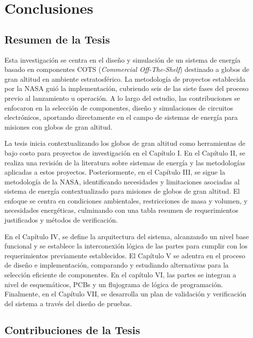 \chapter{Conclusiones}

\section{Resumen de la Tesis}


Esta investigación se centra en el diseño y simulación de un sistema de energía basado en componentes COTS (\emph{Commercial Off-The-Shelf}) destinado a globos de gran altitud en ambiente estratosférico. La metodología de proyectos establecida por la NASA guió la implementación, cubriendo seis de las siete fases del proceso previo al lanzamiento u operación. A lo largo del estudio, las contribuciones se enfocaron en la selección de componentes, diseño y simulaciones de circuitos electrónicos, aportando directamente en el campo de sistemas de energía para misiones con globos de gran altitud.

La tesis inicia contextualizando los globos de gran altitud como herramientas de bajo costo para proyectos de investigación en el Capítulo I. En el Capítulo II, se realiza una revisión de la literatura sobre sistemas de energía y las metodologías aplicadas a estos proyectos. Posteriormente, en el Capítulo III, se sigue la metodología de la NASA, identificando necesidades y limitaciones asociadas al sistema de energía contextualizado para misiones de globos de gran altitud. El enfoque se centra en condiciones ambientales, restricciones de masa y volumen, y necesidades energéticas, culminando con una tabla resumen de requerimientos justificados y métodos de verificación.

En el Capítulo IV, se define la arquitectura del sistema, alcanzando un nivel base funcional y se establece la interconexión lógica de las partes para cumplir con los requerimientos previamente establecidos. El Capítulo V se adentra en el proceso de diseño e implementación, comparando y estudiando alternativas para la selección eficiente de componentes. En el capítulo VI, las partes se integran a nivel de esquemáticos, PCBs y un flujograma de lógica de programación. Finalmente, en el Capítulo VII, se desarrolla un plan  de validación y verificación del sistema a través del diseño de pruebas.



\newpage
\section{Contribuciones de la Tesis}

